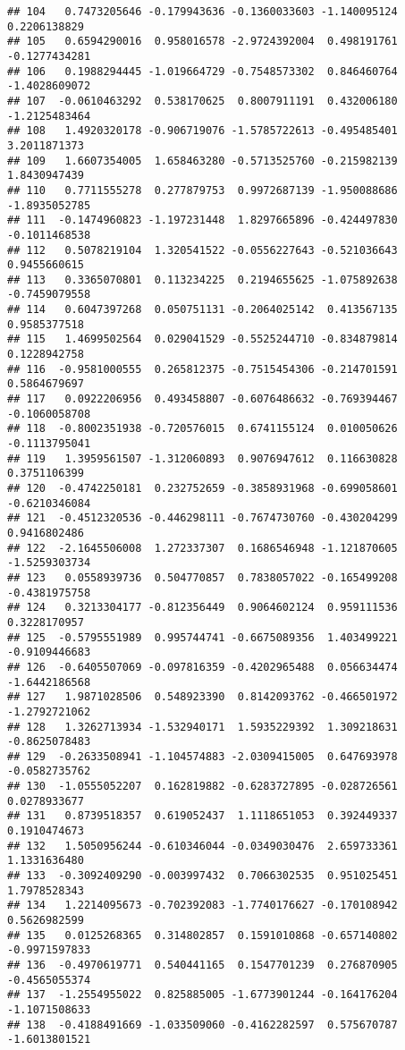 \documentclass[
]{article}
\begin{document}
\begin{verbatim}
## 104   0.7473205646 -0.179943636 -0.1360033603 -1.140095124  0.2206138829
## 105   0.6594290016  0.958016578 -2.9724392004  0.498191761 -0.1277434281
## 106   0.1988294445 -1.019664729 -0.7548573302  0.846460764 -1.4028609072
## 107  -0.0610463292  0.538170625  0.8007911191  0.432006180 -1.2125483464
## 108   1.4920320178 -0.906719076 -1.5785722613 -0.495485401  3.2011871373
## 109   1.6607354005  1.658463280 -0.5713525760 -0.215982139  1.8430947439
## 110   0.7711555278  0.277879753  0.9972687139 -1.950088686 -1.8935052785
## 111  -0.1474960823 -1.197231448  1.8297665896 -0.424497830 -0.1011468538
## 112   0.5078219104  1.320541522 -0.0556227643 -0.521036643  0.9455660615
## 113   0.3365070801  0.113234225  0.2194655625 -1.075892638 -0.7459079558
## 114   0.6047397268  0.050751131 -0.2064025142  0.413567135  0.9585377518
## 115   1.4699502564  0.029041529 -0.5525244710 -0.834879814  0.1228942758
## 116  -0.9581000555  0.265812375 -0.7515454306 -0.214701591  0.5864679697
## 117   0.0922206956  0.493458807 -0.6076486632 -0.769394467 -0.1060058708
## 118  -0.8002351938 -0.720576015  0.6741155124  0.010050626 -0.1113795041
## 119   1.3959561507 -1.312060893  0.9076947612  0.116630828  0.3751106399
## 120  -0.4742250181  0.232752659 -0.3858931968 -0.699058601 -0.6210346084
## 121  -0.4512320536 -0.446298111 -0.7674730760 -0.430204299  0.9416802486
## 122  -2.1645506008  1.272337307  0.1686546948 -1.121870605 -1.5259303734
## 123   0.0558939736  0.504770857  0.7838057022 -0.165499208 -0.4381975758
## 124   0.3213304177 -0.812356449  0.9064602124  0.959111536  0.3228170957
## 125  -0.5795551989  0.995744741 -0.6675089356  1.403499221 -0.9109446683
## 126  -0.6405507069 -0.097816359 -0.4202965488  0.056634474 -1.6442186568
## 127   1.9871028506  0.548923390  0.8142093762 -0.466501972 -1.2792721062
## 128   1.3262713934 -1.532940171  1.5935229392  1.309218631 -0.8625078483
## 129  -0.2633508941 -1.104574883 -2.0309415005  0.647693978 -0.0582735762
## 130  -1.0555052207  0.162819882 -0.6283727895 -0.028726561  0.0278933677
## 131   0.8739518357  0.619052437  1.1118651053  0.392449337  0.1910474673
## 132   1.5050956244 -0.610346044 -0.0349030476  2.659733361  1.1331636480
## 133  -0.3092409290 -0.003997432  0.7066302535  0.951025451  1.7978528343
## 134   1.2214095673 -0.702392083 -1.7740176627 -0.170108942  0.5626982599
## 135   0.0125268365  0.314802857  0.1591010868 -0.657140802 -0.9971597833
## 136  -0.4970619771  0.540441165  0.1547701239  0.276870905 -0.4565055374
## 137  -1.2554955022  0.825885005 -1.6773901244 -0.164176204 -1.1071508633
## 138  -0.4188491669 -1.033509060 -0.4162282597  0.575670787 -1.6013801521

\end{verbatim}
\end{document}
